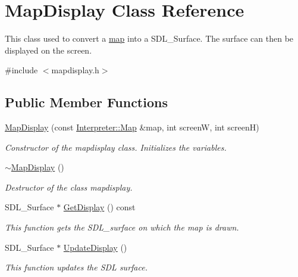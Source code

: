 \hypertarget{classMapDisplay}{
\section{MapDisplay Class Reference}
\label{classMapDisplay}
}


This class used to convert a \hyperlink{classInterpreter_a4c080f069f557cf92dfe803117a6ea53}{map} into a SDL\_\-Surface. The surface can then be displayed on the screen.  




{\ttfamily \#include $<$mapdisplay.h$>$}

\subsection*{Public Member Functions}
\begin{DoxyCompactItemize}
\item 
\hyperlink{classMapDisplay_a3af0dfed1bf4e41a1fe810271593729d}{MapDisplay} (const \hyperlink{classMatrix}{Interpreter::Map} \&map, int screenW, int screenH)
\begin{DoxyCompactList}\small\item\em Constructor of the mapdisplay class. Initializes the variables. \item\end{DoxyCompactList}\item 
\hyperlink{classMapDisplay_a95dc44c5a18970df2131eeb10b59cd21}{$\sim$MapDisplay} ()
\begin{DoxyCompactList}\small\item\em Destructor of the class mapdisplay. \item\end{DoxyCompactList}\item 
SDL\_\-Surface $\ast$ \hyperlink{classMapDisplay_a346dbbf98f1ab76cddab55dfb9c07b27}{GetDisplay} () const 
\begin{DoxyCompactList}\small\item\em This function gets the SDL\_\-surface on which the map is drawn. \item\end{DoxyCompactList}\item 
SDL\_\-Surface $\ast$ \hyperlink{classMapDisplay_a1f8666a47c77fe1294af449e746430dc}{UpdateDisplay} ()
\begin{DoxyCompactList}\small\item\em This function updates the SDL surface. \item\end{DoxyCompactList}\end{DoxyCompactItemize}
